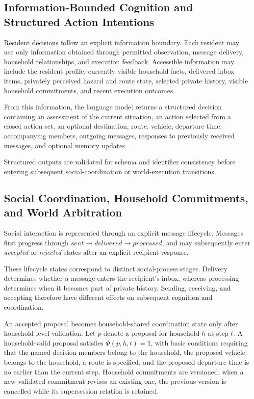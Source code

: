 \documentclass[journal]{IEEEtran}
\begin{document}
\subsection{Information-Bounded Cognition and Structured Action Intentions}

Resident decisions follow an explicit information boundary. Each resident may
use only information obtained through permitted observation, message delivery,
household relationships, and execution feedback. Accessible information may
include the resident profile, currently visible household facts, delivered inbox
items, privately perceived hazard and route state, selected private history,
visible household commitments, and recent execution outcomes.

From this information, the language model returns a structured decision
containing an assessment of the current situation, an action selected from a
closed action set, an optional destination, route, vehicle, departure time,
accompanying members, outgoing messages, responses to previously received
messages, and optional memory updates.

Structured outputs are validated for schema and identifier consistency before
entering subsequent social-coordination or world-execution transitions.

\subsection{Social Coordination, Household Commitments, and World Arbitration}
\label{sec:messages-arbitration}

Social interaction is represented through an explicit message lifecycle.
Messages first progress through
$\textit{sent} \to \textit{delivered} \to \textit{processed}$,
and may subsequently enter \textit{accepted} or \textit{rejected} states after
an explicit recipient response.

These lifecycle states correspond to distinct social-process stages. Delivery
determines whether a message enters the recipient's inbox, whereas processing
determines when it becomes part of private history. Sending, receiving, and
accepting therefore have different effects on subsequent cognition and
coordination.

An accepted proposal becomes household-shared coordination state only after
household-level validation. Let $p$ denote a proposal for household $h$ at step
$t$. A household-valid proposal satisfies $\Phi(p,h,t)=1$, with basic conditions
requiring that the named decision members belong to the household, the proposed
vehicle belongs to the household, a route is specified, and the proposed
departure time is no earlier than the current step. Household commitments are
versioned; when a new validated commitment revises an existing one, the previous
version is cancelled while its supersession relation is retained.
\end{document}
